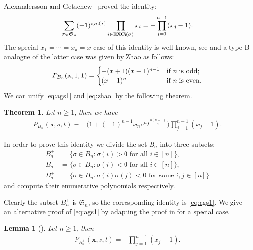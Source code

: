 \documentclass[12pt,reqno]{amsart}
\numberwithin{equation}{section}
\newcommand\cyc{\mathop{ \rm cyc}}
\newcounter{num}
\def\S{\mathfrak{ S}}
\def\x{\mathbf{ x}}
\def\cyc{\mathop{\rm cyc}}
\newtheorem{thm}{Theorem}
\newtheorem{lem}{Lemma}
\begin{document}
Alexandersson and Getachew~\cite[Proposition 29]{AG21}
 proved the identity:
\begin{align}\label{eq:ags1}
	\sum_{\sigma\in \S_n}(-1)^{\cyc(\sigma)} \prod_{i\in \mathrm{EXCi}(\sigma)}x_i=
	-\prod^{n-1}_{j=1}(x_j-1).
\end{align}
The special $x_1=\cdots =x_n=x$ case of this
identity is well known, see \cite{Br00, KZ03} and 
 a type B analogue
of the latter case was given by 
Zhao \cite[Theorem 3]{Zh13}  as follows:
\begin{equation}\label{eq:zhao}
	P_{B_n}(\mathbf{x},1,1)=
	\begin{cases}
		-(x+1)(x-1)^{n-1} &\text{if $ n$ is odd};\\
		(x-1)^n & \text{if $n$ is even}.
	\end{cases}
\end{equation}
We can  unify  \eqref{eq:ags1} and \eqref{eq:zhao} by the  following theorem.
\begin{thm}\label{eq:Bexc} 
	Let $n\ge 1$, then we have
	\begin{align}\label{EXC}
		P_{B_n}(\x, s, t)=-\biggl(1+(-1)^{n-1}x_ns^nt^{\frac{n(n+1)}{2}}\biggr)\prod^{n-1}_{j=1}(x_j-1).
	\end{align}
\end{thm}

In order  to prove this identity we divide the set $B_n$ into three subsets:
\begin{align*}
	B^+_n&=\{\sigma\in B_n: \sigma(i)>0 \text{ for all } i\in [n]\},\\
	B^-_n&=\{\sigma\in B_n: \sigma(i)<0 \text{ for all } i\in [n]\},\\
	B^{\pm}_n&=\{\sigma\in B_n: \sigma(i)\sigma(j)<0 \text{ for some } i,j\in [n]\}
\end{align*}
and compute their enumerative polynomials respectively.


Clearly the subset $B^+_n$ is $\S_n$,  
so the corresponding identity is \eqref{eq:ags1}. 
We give an alternative  proof of \eqref{eq:ags1} by adapting the proof in \cite{KZ03} for a special case.

\begin{lem}[\cite{AG21}]\label{lem4}
	Let $n\ge1$, then
	\begin{align}\label{eq:lem4}
		P_{B^+_n}(\x,s,t)=-\prod^{n-1}_{j=1}(x_j-1).
	\end{align}
\end{lem}
\end{document}
